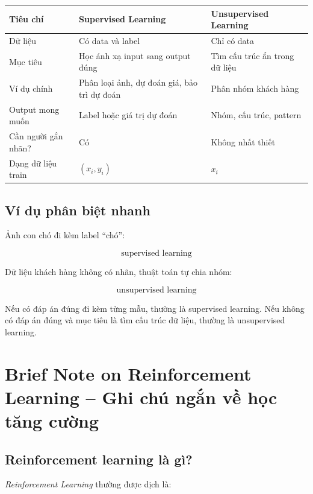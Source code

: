 \begin{center}
\begin{tabular}{p{}p{}p{}}
\toprule
Tiêu chí & Supervised Learning & Unsupervised Learning \\
\midrule
Dữ liệu & Có data và label & Chỉ có data \\
Mục tiêu & Học ánh xạ input sang output đúng & Tìm cấu trúc ẩn trong dữ liệu \\
Ví dụ chính & Phân loại ảnh, dự đoán giá, bảo trì dự đoán & Phân nhóm khách hàng \\
Output mong muốn & Label hoặc giá trị dự đoán & Nhóm, cấu trúc, pattern \\
Cần người gắn nhãn? & Có & Không nhất thiết \\
Dạng dữ liệu train & $(x_i,y_i)$ & $x_i$ \\
\bottomrule
\end{tabular}
\end{center}

\subsection{Ví dụ phân biệt nhanh}

Ảnh con chó đi kèm label ``chó'':

\[
    \text{supervised learning}
\]

Dữ liệu khách hàng không có nhãn, thuật toán tự chia nhóm:

\[
    \text{unsupervised learning}
\]

\begin{ghinho}
Nếu có đáp án đúng đi kèm từng mẫu, thường là supervised learning. Nếu không có đáp án đúng và mục tiêu là tìm cấu trúc dữ liệu, thường là unsupervised learning.
\end{ghinho}

\section{Brief Note on Reinforcement Learning -- Ghi chú ngắn về học tăng cường}

\subsection{Reinforcement learning là gì?}

\textit{Reinforcement Learning} thường được dịch là:

